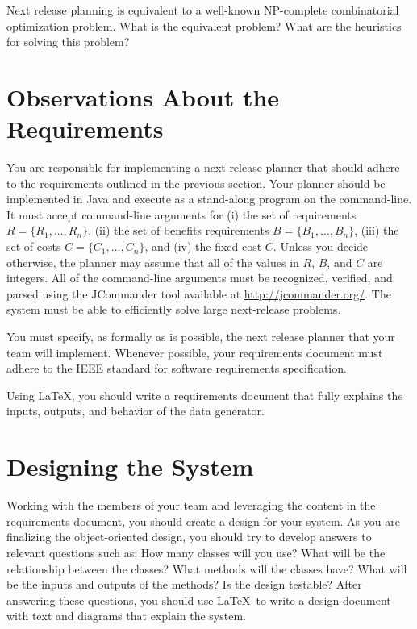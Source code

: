 Next release planning is equivalent to a well-known NP-complete combinatorial optimization problem.  What is the
equivalent problem? What are the heuristics for solving this problem?

\section*{Observations About the Requirements}

You are responsible for implementing a next release planner that should adhere to the requirements outlined in the
previous section.  Your planner should be implemented in Java and execute as a stand-along program on the command-line.
It must accept command-line arguments for (i) the set of requirements $R = \{ R_1, \ldots, R_n \}$, (ii) the set of
benefits requirements $B = \{ B_1, \ldots, B_n \}$, (iii) the set of costs $C = \{ C_1, \ldots, C_n \}$, and (iv) the
fixed cost $C$. Unless you decide otherwise, the planner may assume that all of the values in $R$, $B$, and $C$ are
integers. All of the command-line arguments must be recognized, verified, and parsed using the JCommander tool
available at \url{http://jcommander.org/}. The system must be able to efficiently solve
large next-release problems.

You must specify, as formally as is possible, the next release planner that your team will implement.  Whenever
possible, your requirements document must adhere to the IEEE standard for software requirements specification.



Using \LaTeX, you
should write a requirements document that fully explains the inputs, outputs, and behavior of the data generator.

\section*{Designing the System}

Working with the members of your team and leveraging the content in the requirements document, you should create a
design for your system.  As you are finalizing the object-oriented design, you should try to develop answers to relevant
questions such as: How many classes will you use? What will be the relationship between the classes? What methods will
the classes have? What will be the inputs and outputs of the methods?  Is the design testable?  After answering these
questions, you should use \LaTeX\  to write a design document with text and diagrams that explain the system.


